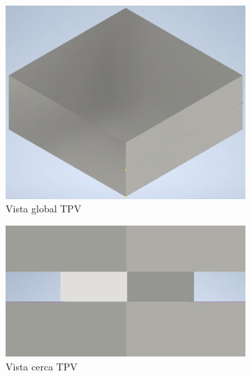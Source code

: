 \begin{enumerate}
\begin{figure}[H]
\begin{subfigure}[b]{0.3\textwidth}
		\centering
			\includegraphics[width=1.00\textwidth]{figuras/Procedimiento_Simulaciones/Conduccion/modelado3D_lejos.png}
		\caption{Vista global TPV}
		\label{fig:modelado3D_lejos}
	\end{subfigure}
	\hfill
	\begin{subfigure}[b]{0.3\textwidth}
		\centering
			\includegraphics[width=1.00\textwidth]{figuras/Procedimiento_Simulaciones/Conduccion/modelado3D_cerca.png}
		\caption{Vista cerca TPV}
		\label{fig:modelado3D_cerca}
	\end{subfigure}
	\hfill
	\begin{subfigure}[b]{0.3\textwidth}
		\centering

\end{subfigure}
\end{figure}
\end{enumerate}
